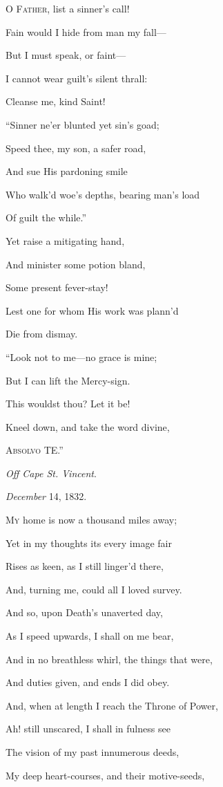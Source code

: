 O F\textsc{ather}, list a sinner's call!

Fain would I hide from man my fall—

But I must speak, or faint—

I cannot wear guilt's silent thrall:

Cleanse me, kind Saint!

``Sinner ne'er blunted yet sin's goad;

Speed thee, my son, a safer road,

And sue His pardoning smile

Who walk'd woe's depths, bearing man's load

Of guilt the while.''

Yet raise a mitigating hand,

And minister some potion bland,

Some present fever-stay!

Lest one for whom His work was plann'd

Die from dismay. 

``Look not to me—no grace is mine;

But I can lift the Mercy-sign.

This wouldst thou? Let it be!

Kneel down, and take the word divine,

A\textsc{bsolvo} TE.''

\emph{Off Cape St. Vincent}.

\emph{December} 14, 1832.


M\textsc{y} home is now a thousand miles away;

Yet in my thoughts its every image fair

Rises as keen, as I still linger'd there,

And, turning me, could all I loved survey.

And so, upon Death's unaverted day,

As I speed upwards, I shall on me bear,

And in no breathless whirl, the things that were,

And duties given, and ends I did obey.

And, when at length I reach the Throne of Power,

Ah! still unscared, I shall in fulness see

The vision of my past innumerous deeds,

My deep heart-courses, and their motive-seeds,

